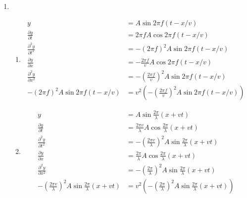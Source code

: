 \documentclass{article}
\begin{document}
\begin{enumerate}
  \item

        \begin{enumerate}
          \item

                \begin{align*}
                  y                                       & = A \sin 2 \pi f (t - x / v)                                                        \\
                  \frac{\partial y}{\partial t}           & = 2 \pi f A \cos 2 \pi f (t - x / v)                                                \\
                  \frac{\partial^2 y}{\partial t^2}       & = -(2 \pi f)^2 A \sin 2 \pi f (t - x / v)                                           \\
                  \frac{\partial y}{\partial x}           & = -\frac{2 \pi f}{v} A \cos 2 \pi f (t - x / v)                                     \\
                  \frac{\partial^2 y}{\partial x^2}       & = -\left( \frac{2 \pi f}{v} \right)^2 A \sin 2 \pi f (t - x / v)                    \\
                  -(2 \pi f)^2 A \sin 2 \pi f (t - x / v) & = v^2 \left( -\left( \frac{2 \pi f}{v} \right)^2 A \sin 2 \pi f (t - x / v) \right)
                \end{align*}

          \item

                \begin{align*}
                  y                                                                                & = A \sin \frac{2 \pi}{\lambda} (x + v t)                                                            \\
                  \frac{\partial y}{\partial t}                                                    & = \frac{2 \pi v}{\lambda} A \cos \frac{2 \pi}{\lambda} (x + v t)                                    \\
                  \frac{\partial^2 y}{\partial t^2}                                                & = -\left( \frac{2 \pi v}{\lambda} \right)^2 A \sin \frac{2 \pi}{\lambda} (x + v t)                  \\
                  \frac{\partial y}{\partial x}                                                    & = \frac{2 \pi}{\lambda} A \cos \frac{2 \pi}{\lambda} (x + v t)                                      \\
                  \frac{\partial^2 y}{\partial x^2}                                                & = -\left( \frac{2 \pi}{\lambda} \right)^2 A \sin \frac{2 \pi}{\lambda} (x + v t)                    \\
                  -\left( \frac{2 \pi v}{\lambda} \right)^2 A \sin \frac{2 \pi}{\lambda} (x + v t) & = v^2 \left( -\left( \frac{2 \pi}{\lambda} \right)^2 A \sin \frac{2 \pi}{\lambda} (x + v t) \right)
                \end{align*}


\end{enumerate}
\end{enumerate}
\end{document}
